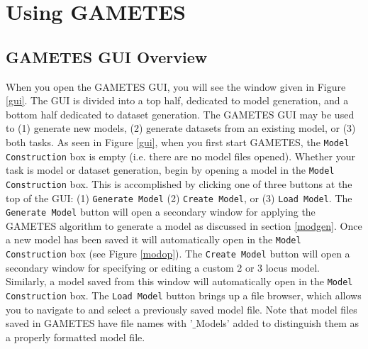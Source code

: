 \documentclass{report}
\begin{document}
\chapter{Using GAMETES}   
\section{GAMETES GUI Overview} 
When you open the GAMETES GUI, you will see the window given in Figure \ref{gui}.  The GUI is divided into a top half, dedicated to model generation, and a bottom half dedicated to dataset generation.  The GAMETES GUI may be used to (1) generate new models, (2) generate datasets from an existing model, or (3) both tasks.  As seen in Figure \ref{gui}, when you first start GAMETES, the \texttt{Model Construction} box is empty (i.e. there are no model files opened).  Whether your task is model or dataset generation, begin by opening a model in the \texttt{Model Construction} box.  This is accomplished by clicking one of three buttons at the top of the GUI: (1) \texttt{Generate Model} (2) \texttt{Create Model}, or (3) \texttt{Load Model}.  The \texttt{Generate Model} button will open a secondary window for applying the GAMETES algorithm to generate a model as discussed in section \ref{modgen}.  Once a new model has been saved it will automatically open in the \texttt{Model Construction} box (see Figure \ref{modop}).  The \texttt{Create Model} button will open a secondary window for specifying or editing a custom 2 or 3 locus model.  Similarly, a model saved from this window will automatically open in the \texttt{Model Construction} box.  The \texttt{Load Model} button brings up a file browser, which allows you to navigate to and select a previously saved model file.  Note that model files saved in GAMETES have file names with '$\_$Models' added to distinguish them as a properly formatted model file.
\end{document}
